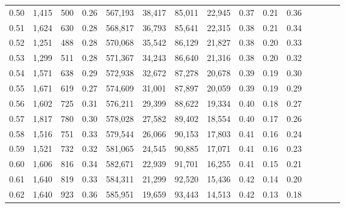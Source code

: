 \begin{tabular}{rrrcrrrrrrrrrrr}
0.50 &   1,415 &    500 &                                       0.26 &  567,193 &   38,417 &   85,011 &   22,945 &  0.37 &  0.21 &                         0.36 \\
0.51 &   1,624 &    630 &                                       0.28 &  568,817 &   36,793 &   85,641 &   22,315 &  0.38 &  0.21 &                         0.34 \\
0.52 &   1,251 &    488 &                                       0.28 &  570,068 &   35,542 &   86,129 &   21,827 &  0.38 &  0.20 &                         0.33 \\
0.53 &   1,299 &    511 &                                       0.28 &  571,367 &   34,243 &   86,640 &   21,316 &  0.38 &  0.20 &                         0.32 \\
0.54 &   1,571 &    638 &                                       0.29 &  572,938 &   32,672 &   87,278 &   20,678 &  0.39 &  0.19 &                         0.30 \\
0.55 &   1,671 &    619 &                                       0.27 &  574,609 &   31,001 &   87,897 &   20,059 &  0.39 &  0.19 &                         0.29 \\
0.56 &   1,602 &    725 &                                       0.31 &  576,211 &   29,399 &   88,622 &   19,334 &  0.40 &  0.18 &                         0.27 \\
0.57 &   1,817 &    780 &                                       0.30 &  578,028 &   27,582 &   89,402 &   18,554 &  0.40 &  0.17 &                         0.26 \\
0.58 &   1,516 &    751 &                                       0.33 &  579,544 &   26,066 &   90,153 &   17,803 &  0.41 &  0.16 &                         0.24 \\
0.59 &   1,521 &    732 &                                       0.32 &  581,065 &   24,545 &   90,885 &   17,071 &  0.41 &  0.16 &                         0.23 \\
0.60 &   1,606 &    816 &                                       0.34 &  582,671 &   22,939 &   91,701 &   16,255 &  0.41 &  0.15 &                         0.21 \\
0.61 &   1,640 &    819 &                                       0.33 &  584,311 &   21,299 &   92,520 &   15,436 &  0.42 &  0.14 &                         0.20 \\
0.62 &   1,640 &    923 &                                       0.36 &  585,951 &   19,659 &   93,443 &   14,513 &  0.42 &  0.13 &                         0.18 \\

\end{tabular}
